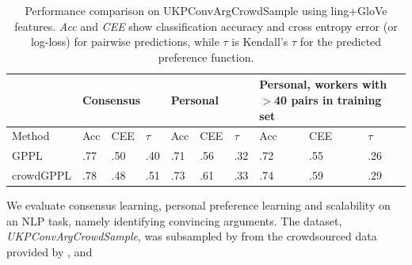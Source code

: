 \begin{table}
\small
\begin{tabularx}{\columnwidth}{ | l | X | X | X | X | X | X | X | X | X |}
\hline
 & \multicolumn{3}{l|}{Consensus}&\multicolumn{3}{l|}{Personal} &\multicolumn{3}{p{3.1cm}|}{Personal, workers with $>$40 pairs in training set} \\ \hline
 Method & Acc & CEE & $\tau$ & Acc & CEE & $\tau$ & Acc & CEE & $\tau$ \\ \hline
 GPPL %
  & .77 & .50 & .40 & .71 & .56 & .32 & .72 & .55 & .26 \\ %
 crowdGPPL %
 & .78 & .48 & .51 & .73 & .61 & .33 & .74 & .59 & .29  %
 \\\hline
\end{tabularx}
\caption{Performance comparison on UKPConvArgCrowdSample using ling+GloVe features. \emph{Acc} and \emph{CEE} show classification accuracy and cross entropy error (or log-loss) for pairwise predictions, 
while $\tau$ is Kendall's $\tau$ for the predicted preference function. }
\label{tab:convarg}
\end{table}
We evaluate consensus learning, personal preference learning and scalability
on an NLP task, namely identifying convincing arguments. 
The dataset, \emph{UKPConvArgCrowdSample}, was subsampled by \citet{simpson2018finding}
from the crowdsourced data provided by \citet{habernal2016argument}, and
